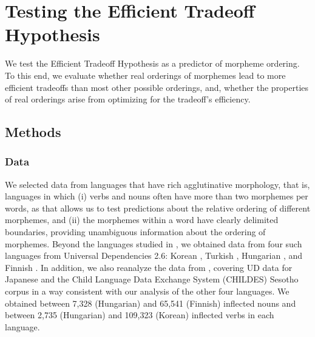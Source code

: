 \documentclass[11pt,letterpaper]{article}
\newcommand{\citep}{\parencite}
\newcommand{\citet}{\Textcite}
\newcommand{\jd}[1]{\textcolor{Pink}{[jd: #1]}}
\begin{document}
\section{Testing the Efficient Tradeoff Hypothesis}\label{seq:testing}



We test the Efficient Tradeoff Hypothesis as a predictor of morpheme ordering.
To this end, we evaluate whether real orderings of morphemes lead to more efficient tradeoffs than most other possible orderings, and, whether the properties of real orderings arise from optimizing for the tradeoff's efficiency.

\subsection{Methods} 

\subsubsection{Data} 
We selected data from languages that have rich agglutinative morphology, that is, languages in which (i) verbs and nouns often have more than two morphemes per words, as that allows us to test predictions about the relative ordering of different morphemes, and (ii) the morphemes within a word have clearly delimited boundaries, providing unambiguous information about the ordering of morphemes.
Beyond the languages studied in \citet{Hahn2020modeling}, we obtained data from four such languages from Universal Dependencies \citep[UD][]{DBLP:conf/lrec/NivreMGHMPSTZ20} 2.6: Korean \citep{chun2018building}, Turkish \citep{turkish-imst}, Hungarian \citep{hungarian-szeged}, and Finnish \citep{UDFinnish-TDT,UDFinnish-FTB}.
In addition, we also reanalyze the data from \citet{Hahn2020modeling}, covering UD data for Japanese \citep{asahara2018universal} and the Child Language Data Exchange System (CHILDES) Sesotho corpus \citep{demuth1992acquisition} in a way consistent with our analysis of the other four languages.
We obtained between 7,328 (Hungarian) and 65,541 (Finnish) inflected nouns and between 2,735 (Hungarian) and 109,323 (Korean) inflected verbs in each language.
\end{document}
